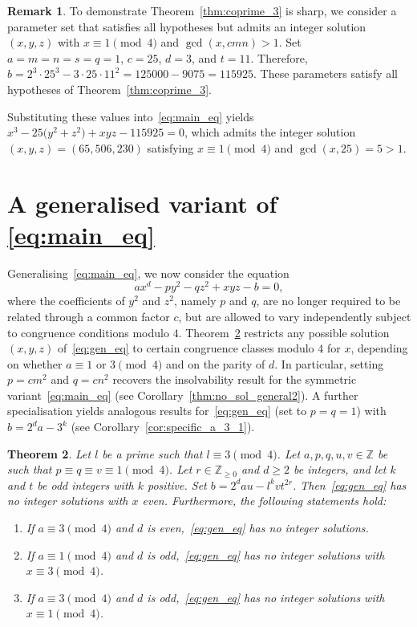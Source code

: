 \documentclass[11pt,a4paper]{amsart}
\newcommand{\ZZ}{\mathbb{Z}}
\theoremstyle{plain}
\newtheorem{theorem}{Theorem}[section]
\theoremstyle{definition}
\newtheorem{remark}[theorem]{Remark}
\begin{document}
\begin{remark}\label{rem:sharpness}
To demonstrate Theorem~\ref{thm:coprime_3} is sharp, we consider a parameter set that satisfies all hypotheses but admits an integer solution $(x,y,z)$ with $x \equiv 1 \pmod 4$ and $\gcd(x, cmn) > 1$. Set $a=m=n=s=q=1$, $c=25$, $d=3$, and $t=11$. Therefore, $b = 2^3 \cdot25^3 - 3\cdot25 \cdot 11^2 = 125000 - 9075 = 115925$. These parameters satisfy all hypotheses of Theorem~\ref{thm:coprime_3}.

Substituting these values into~\eqref{eq:main_eq} yields $x^3 - 25\bigl(y^2 + z^2\bigr) + xyz - 115925 = 0$, which admits the integer solution $(x,y,z)=(65, 506, 230)$ satisfying $x \equiv 1 \pmod 4$ and $\gcd(x, 25) = 5 > 1$.
\end{remark}%
\section{A generalised variant of \texorpdfstring{\eqref{eq:main_eq}}{}}\label{sec:asymmetric}
Generalising~\eqref{eq:main_eq}, we now consider the equation
\begin{equation}\label{eq:gen_eq}
  ax^{d} - py^{2} - qz^{2} + xyz - b = 0,
\end{equation}
where the coefficients of $y^2$ and $z^2$, namely $p$ and $q$, are no longer required to be related through a common factor $c$, but are allowed to vary independently subject to congruence conditions modulo $4$. Theorem~\ref{thm:main_general} restricts any possible solution $(x,y,z)$ of~\eqref{eq:gen_eq} to certain congruence classes modulo $4$ for $x$, depending on whether $a\equiv 1$ or $3\pmod{4}$ and on the parity of $d$. In particular, setting $p = cm^2$ and $q = cn^2$ recovers the insolvability result for the symmetric variant~\eqref{eq:main_eq} (see Corollary~\ref{thm:no_sol_general2}). A further specialisation yields analogous results for~\eqref{eq:gen_eq} (set to $p=q=1$) with $b = 2^d a - 3^k$ (see Corollary~\ref{cor:specific_a_3_1}).

\begin{theorem}\label{thm:main_general}
Let $l$ be a prime such that $l \equiv 3 \pmod 4$. Let $a,p, q, u, v \in \ZZ$ be such that $p \equiv q \equiv v \equiv 1 \pmod 4$. Let $r \in \ZZ_{\ge 0}$ and $d \ge 2$ be integers, and let $k$ and $t$ be odd integers with $k$ positive. Set $b = 2^{d}au - l^{k}vt^{2r}$. Then~\eqref{eq:gen_eq} has no integer solutions with $x$ even. Furthermore, the following statements hold:
\begin{enumerate}[label=(\alph*)]
\item If $a \equiv 3 \pmod 4$ and $d$ is even,~\eqref{eq:gen_eq} has no integer solutions.\label{Conition:1}
    \item If $a \equiv 1 \pmod 4$ and $d$ is odd,~\eqref{eq:gen_eq} has no integer solutions with $x \equiv 3 \pmod 4$. \label{Conition:2}
    \item If $a \equiv 3 \pmod 4$ and $d$ is odd,~\eqref{eq:gen_eq} has no integer solutions with $x \equiv 1 \pmod 4$.\label{Conition:3}
\end{enumerate}
\end{theorem}
\end{document}
